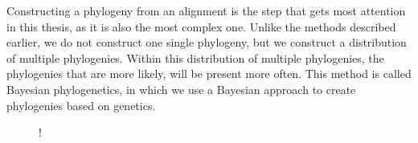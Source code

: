 
Constructing a phylogeny from an alignment is the step that
gets most attention in this thesis, as it is also the most complex
one. Unlike the methods described earlier, 
we do not construct one single phylogeny, 
but we construct a distribution of multiple phylogenies.
Within this distribution of multiple phylogenies, the phylogenies
that are more likely, will be present more often.
This method is called Bayesian phylogenetics, in which we use
a Bayesian approach to create phylogenies based on genetics.

\begin{figure}[H]
  \centering
   {!} {
    }
\end{figure}
